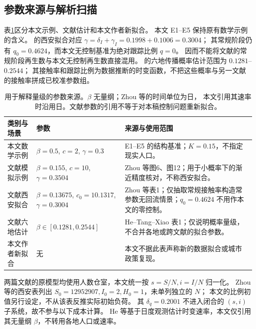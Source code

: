 \subsection{参数来源与解析扫描}
表\ref{tab:parameter-sources}区分本文示例、文献估计和本文作者新拟合。
本文 E1--E5 保持原有数学示例的含义。
\citet[第8节，表1]{Zhou2024SPCI}的西安拟合对应
$\gamma=\delta_I+\gamma_I=0.1998+0.1006=0.3004$；
其常规阶段仍有 $q_0=0.4624$，而本文无控制基准为绝对跟踪比例 $q=0$。
因而不能将文献的常规阶段再生数与本文无控制再生数直接混用。
\citet[表1]{He2023TDINN}的六地传播概率估计范围为 $0.1281$--$0.2544$；
其接触率和跟踪比例为数据推断的时变函数，不把这些概率与另一文献的接触率拼成已校准参数组。
\begin{table}[htbp]
\centering\small
\caption{用于解释量级的参数来源。$\beta$ 无量纲；Zhou 等的时间单位为日，
本文引用其速率时沿用日。文献参数的引用不等于对本稿控制问题重新拟合。}
\label{tab:parameter-sources}
\begin{tabularx}{\linewidth}{@{}>{\raggedright\arraybackslash}p{2.8cm}>{\raggedright\arraybackslash}p{3.7cm}>{\raggedright\arraybackslash}X@{}}
\toprule
类别与场景 & 参数 & 来源与使用范围\\
\midrule
本文数学示例 & $\beta=0.5$, $c=2$, $\gamma=0.3$ & E1--E5 的结构基准；$K=0.15$，不指定现实人口。\\
文献模拟示例 & $\beta=0.155$, $c=10$, $\gamma=0.3504$ & Zhou 等图6、图12；用于小概率下的渐近精度核对，不称西安拟合。\\
文献西安拟合 & $\beta=0.13675$, $c_0=10.1317$, $\gamma=0.3004$ & Zhou 等表1；仅抽取常规接触率构造常参数无回流情景；$q_0=0.4624$ 不用作本文的零控制。\\
文献六地估计 & $\beta\in[0.1281,0.2544]$ & He--Tang--Xiao 表1；仅说明概率量级，不合并各地或跨文献的拟合参数。\\
本文作者新拟合 & 无 & 本文不据此表声称新的数据拟合或城市政策复现。\\
\bottomrule
\end{tabularx}
\end{table}

两篇文献的原模型均使用人数仓室，本文统一按 $s=S/N,i=I/N$ 归一化。
Zhou 等的西安表列出 $S_0=12952907,I_0=2,H_0=1$，未单列独立的 $N$；
本文的比例初值另行设定，不从该表反推实际初始负荷。
其 $\delta_q=0.2001$ 不进入闭合的 $(s,i)$ 子系统，故不参与以下成本计算。
He 等基于日度观测估计时变速率，本文仅引用其无量纲 $\beta$，不转用各地人口或速率。


